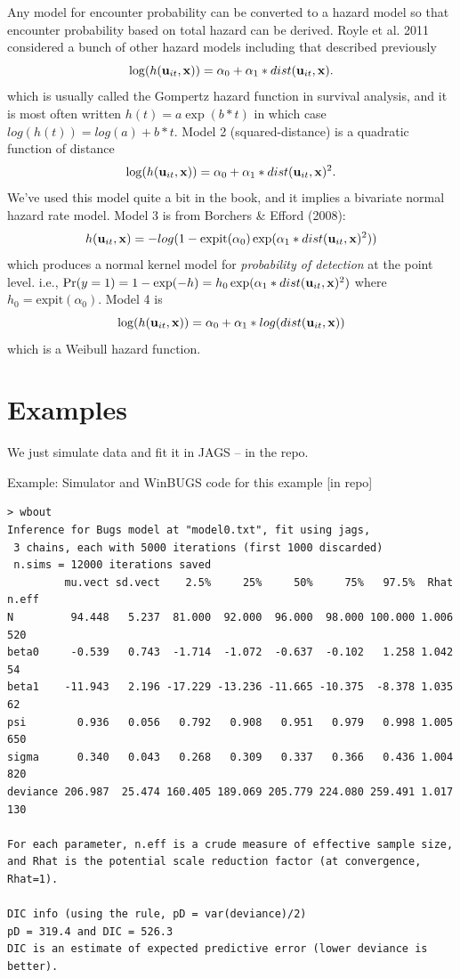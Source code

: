 Any model for encounter probability can be converted to a hazard model
so that encounter probability based on total hazard can be derived.
Royle et al. 2011 considered a bunch of other hazard models including
that described previously
\[
\log(h({\bf u}_{it},{\bf x})) = \alpha_{0} + \alpha_{1}*dist({\bf u}_{it},{\bf x}).
\]
which is usually called the Gompertz hazard function in survival
analysis, and it is most often written $h(t) = a \exp( b*t)$ in which
case $log(h(t)) = log(a) + b*t$.  Model 2 (squared-distance) is a
quadratic function of distance
\[
\log(h({\bf u}_{it},{\bf x})) = \alpha_{0} + \alpha_{1}*dist({\bf u}_{it},{\bf x})^2.
\]
We've used this model quite a bit in the book, and it implies a
bivariate normal hazard rate model. Model 3 is from Borchers \& Efford
(2008):
\[
h({\bf u}_{it},{\bf x} ) = -log(1 - \mbox{expit}(\alpha_{0})
\exp( \alpha_{1}*dist({\bf u}_{it},{\bf x})^2 ) )
\]
which produces a normal kernel model for {\it probability of
  detection} at the point level. i.e., $\Pr(y=1) = 1-\exp(-h) = h_{0}
\exp( \alpha_{1}*dist({\bf u}_{it},{\bf x})^2 )$ where $h_{0} =
\mbox{expit}(\alpha_{0})$.  Model 4 is
\[
\log(h({\bf u}_{it},{\bf x})) = \alpha_{0} + \alpha_{1}*log(dist({\bf u}_{it},{\bf x}))
\]
which is a Weibull hazard function.


\section{Examples}

We just simulate data and fit it in JAGS -- in the repo.

Example: Simulator and WinBUGS code for this example [in repo]


\begin{verbatim}
> wbout
Inference for Bugs model at "model0.txt", fit using jags,
 3 chains, each with 5000 iterations (first 1000 discarded)
 n.sims = 12000 iterations saved
         mu.vect sd.vect    2.5%     25%     50%     75%   97.5%  Rhat n.eff
N         94.448   5.237  81.000  92.000  96.000  98.000 100.000 1.006   520
beta0     -0.539   0.743  -1.714  -1.072  -0.637  -0.102   1.258 1.042    54
beta1    -11.943   2.196 -17.229 -13.236 -11.665 -10.375  -8.378 1.035    62
psi        0.936   0.056   0.792   0.908   0.951   0.979   0.998 1.005   650
sigma      0.340   0.043   0.268   0.309   0.337   0.366   0.436 1.004   820
deviance 206.987  25.474 160.405 189.069 205.779 224.080 259.491 1.017   130

For each parameter, n.eff is a crude measure of effective sample size,
and Rhat is the potential scale reduction factor (at convergence, Rhat=1).

DIC info (using the rule, pD = var(deviance)/2)
pD = 319.4 and DIC = 526.3
DIC is an estimate of expected predictive error (lower deviance is better).
\end{verbatim}





